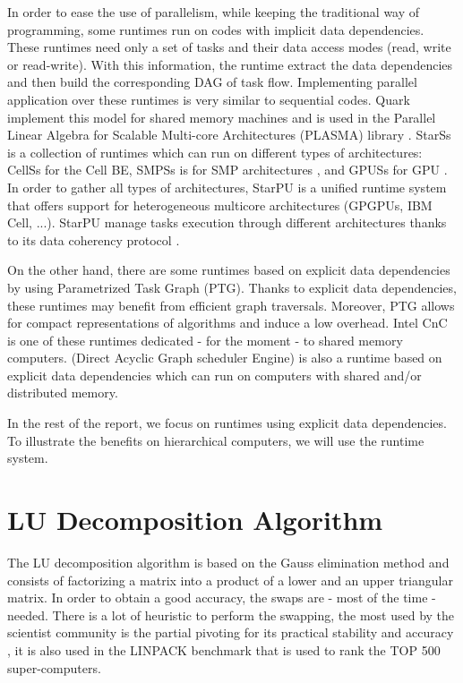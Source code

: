 In order to ease the use of parallelism, while keeping the traditional way of programming, some runtimes run on codes with implicit data dependencies. These runtimes need only a set of tasks and their data access modes (read, write or read-write). With this information, the runtime extract the data dependencies and then build the corresponding DAG of task flow. Implementing parallel application over these runtimes is very similar to sequential codes. Quark implement this model for shared memory machines and is used in the Parallel Linear Algebra for Scalable Multi-core Architectures (PLASMA) library \cite{1742-6596-180-1-012037}.
StarSs is a collection of runtimes which can run on different types of architectures: CellSs for the Cell BE\cite{Bellens06}, SMPSs is for SMP architectures \cite{journals/concurrency/BadiaHLPQQ09}, and GPUSs for GPU \cite{Ayguade09}. In order to gather all types of architectures, StarPU is a unified runtime system that offers support for heterogeneous multicore architectures (GPGPUs, IBM Cell, ...). StarPU manage tasks execution through different architectures thanks to its data coherency protocol \cite{DoBiBo07,journals/concurrency/AugonnetTNW11}.


On the other hand, there are some runtimes based on explicit data dependencies by using Parametrized Task Graph (PTG).
Thanks to explicit data dependencies, these runtimes may benefit from efficient graph traversals. Moreover, PTG allows for compact representations of algorithms and induce a low overhead. Intel CnC is one of these runtimes dedicated - for the moment - to shared memory computers. \dague (Direct Acyclic Graph scheduler Engine) is also a runtime based on explicit data dependencies which can run on computers with shared and/or distributed memory.

In the rest of the report, we focus on runtimes using explicit data dependencies. To illustrate the benefits on hierarchical computers, we will use the \dague runtime system. 

\section{LU Decomposition Algorithm}\label{lu_algo}
The LU decomposition algorithm is based on the Gauss elimination method and consists of factorizing a matrix into a product of a lower and an upper triangular matrix. In order to obtain a good accuracy, the swaps are - most of the time - needed. There is a lot of heuristic to perform the swapping, the most used by the scientist community is the partial pivoting for its practical stability and accuracy \cite{Hig02}, it is also used in the LINPACK benchmark that is used to rank the TOP 500 super-computers.

